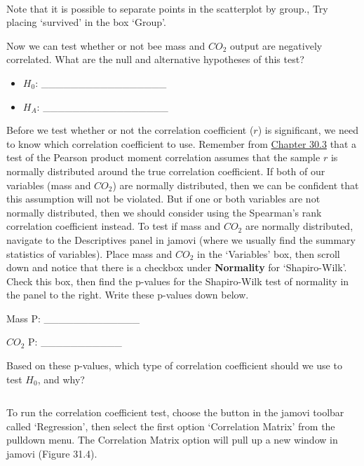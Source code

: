 \documentclass[
  openany]{krantz}
\begin{document}
\begin{verbatim}


\end{verbatim}

Note that it is possible to separate points in the scatterplot by group.,
Try placing `survived' in the box `Group'.

Now we can test whether or not bee mass and \(CO_{2}\) output are negatively correlated.
What are the null and alternative hypotheses of this test?

\begin{itemize}
\item
  \(H_{0}\): \_\_\_\_\_\_\_\_\_\_\_\_\_\_\_\_\_
\item
  \(H_{A}\): \_\_\_\_\_\_\_\_\_\_\_\_\_\_\_\_\_
\end{itemize}

Before we test whether or not the correlation coefficient (\(r\)) is significant, we need to know which correlation coefficient to use.
Remember from \protect\hyperlink{correlation-hypothesis-testing}{Chapter 30.3} that a test of the Pearson product moment correlation assumes that the sample \(r\) is normally distributed around the true correlation coefficient.
If both of our variables (mass and \(CO_{2}\)) are normally distributed, then we can be confident that this assumption will not be violated.
But if one or both variables are not normally distributed, then we should consider using the Spearman's rank correlation coefficient instead.
To test if mass and \(CO_{2}\) are normally distributed, navigate to the Descriptives panel in jamovi (where we usually find the summary statistics of variables).
Place mass and \(CO_{2}\) in the `Variables' box, then scroll down and notice that there is a checkbox under \textbf{Normality} for `Shapiro-Wilk'.
Check this box, then find the p-values for the Shapiro-Wilk test of normality in the panel to the right.
Write these p-values down below.

Mass P: \_\_\_\_\_\_\_\_\_\_\_\_\_

\(CO_{2}\) P: \_\_\_\_\_\_\_\_\_\_\_

Based on these p-values, which type of correlation coefficient should we use to test \(H_{0}\), and why?

\begin{verbatim}

\end{verbatim}

To run the correlation coefficient test, choose the button in the jamovi toolbar called `Regression', then select the first option `Correlation Matrix' from the pulldown menu.
The Correlation Matrix option will pull up a new window in jamovi (Figure 31.4).
\end{document}
